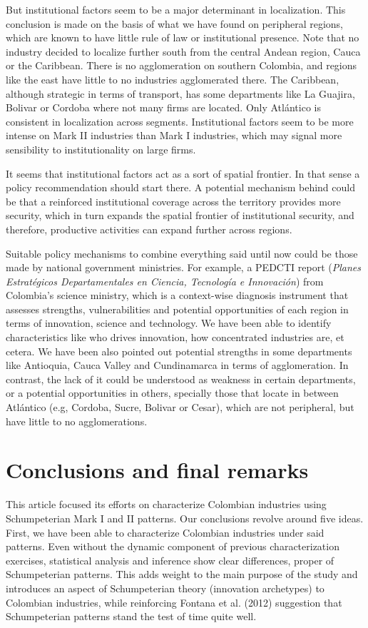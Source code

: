 \documentclass[12pt,a4paper]{article}
\begin{document}
But institutional factors seem to be a major determinant in localization. This conclusion is made on the basis of what we have found on peripheral regions, which are known to have little rule of law or institutional presence. Note that no industry decided to localize further south from the central Andean region, Cauca or the Caribbean. There is no agglomeration on southern Colombia, and regions like the east have little to no industries agglomerated there. The Caribbean, although strategic in terms of transport, has some departments like La Guajira, Bolivar or Cordoba where not many firms are located. Only Atlántico is consistent in localization across segments. Institutional factors seem to be more intense on Mark II industries than Mark I industries, which may signal more sensibility to institutionality on large firms.

It seems that institutional factors act as a sort of spatial frontier. In that sense a policy recommendation should start there. A potential mechanism behind could be that a reinforced institutional coverage across the territory provides more security, which in turn expands the spatial frontier of institutional security, and therefore, productive activities can expand further across regions.

Suitable policy mechanisms to combine everything said until now could be those made by national government ministries. For example, a PEDCTI report (\textit{Planes Estratégicos Departamentales en Ciencia, Tecnología e Innovación}) from Colombia's science ministry, which is a context-wise diagnosis instrument that assesses strengths, vulnerabilities and potential opportunities of each region in terms of innovation, science and technology. We have been able to identify characteristics like who drives innovation, how concentrated industries are, et cetera. We have been also pointed out potential strengths in some departments like Antioquia, Cauca Valley and Cundinamarca in terms of agglomeration. In contrast, the lack of it could be understood as weakness in certain departments, or a potential opportunities in others, specially those that locate in between Atlántico (e.g, Cordoba, Sucre, Bolivar or Cesar), which are not peripheral, but have little to no agglomerations. 


\section{Conclusions and final remarks}

This article focused its efforts on characterize Colombian industries using Schumpeterian Mark I and II patterns. Our conclusions revolve around five ideas. First, we have been able to characterize Colombian industries under said patterns. Even without the dynamic component of previous characterization exercises, statistical analysis and inference show clear differences, proper of Schumpeterian patterns. This adds weight to the main purpose of the study and introduces an aspect of Schumpeterian theory (innovation archetypes) to Colombian industries, while reinforcing Fontana et al. (2012) suggestion that Schumpeterian patterns stand the test of time quite well.
\end{document}
